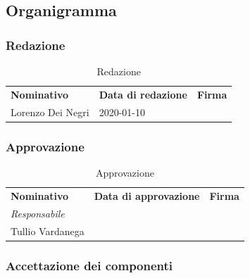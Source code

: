 	\subsection{Organigramma}
		
		\subsubsection{Redazione}
			
			\begin{table}[h!]
				\centering
					\begin{tabular}{lll}
						\textbf{Nominativo} & \textbf{Data di redazione} & \textbf{Firma} \\
						Lorenzo Dei Negri & 2020-01-10 & \\
					\end{tabular}
				\caption{Redazione}
			\end{table}
		
		\subsubsection{Approvazione}
			
			\begin{table}[h!]
				\centering
				\begin{tabular}{lll}
					\textbf{Nominativo} & \textbf{Data di approvazione} & \textbf{Firma} \\
					\textit{Responsabile} & & \\
					Tullio Vardanega & & \\
				\end{tabular}
				\caption{Approvazione}
			\end{table}
			
		\subsubsection{Accettazione dei componenti}
			
